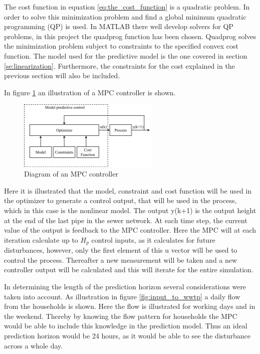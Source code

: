 The cost function in equation \ref{eq:the_cost_function} is a quadratic problem. In order to solve this minimization problem and find a global minimum quadratic programming (QP) is used. In MATLAB there well develop solvers for QP problems, in this project the quadprog function has been chosen. Quadprog solves the minimization problem subject to constraints to the specified convex cost function. The model used for the predictive model is the one covered in section \ref{se:linearization}. Furthermore, the constraints for the cost explained in the previous section will also be included. 

In figure \ref{fig:mpc_diagram} an illustration of a MPC controller is shown.
\begin{figure}[H]
	\centering
	\includegraphics[width=0.60\textwidth]{report/control/pictures/mpc_diagram}
	\caption{Diagram of an MPC controller}
	\label{fig:mpc_diagram}
\end{figure}

Here it is illustrated that the model, constraint and cost function will be used in the optimizer to generate a control output, that will be used in the process, which in this case is the nonlinear model. The output y(k+1) is the output height at the end of the last pipe in the sewer network. At each time step, the current value of the output is feedback to the MPC controller. Here the MPC will at each iteration calculate up to $H_p$ control inputs, as it calculates for future disturbances, however, only the first element of this u vector will be used to control the process. Thereafter a new measurement will be taken and a new controller output will be calculated and this will iterate for the entire simulation.

In determining the length of the prediction horizon several considerations were taken into account. As illustration in figure \ref{fig:input_to_wwtp} a daily flow from the households is shown. Here the flow is illustrated for working days and in the weekend. Thereby by knowing the flow pattern for households the MPC would be able to include this knowledge in the prediction model. Thus an ideal prediction horizon would be 24 hours, as it would be able to see the disturbance across a whole day. 

